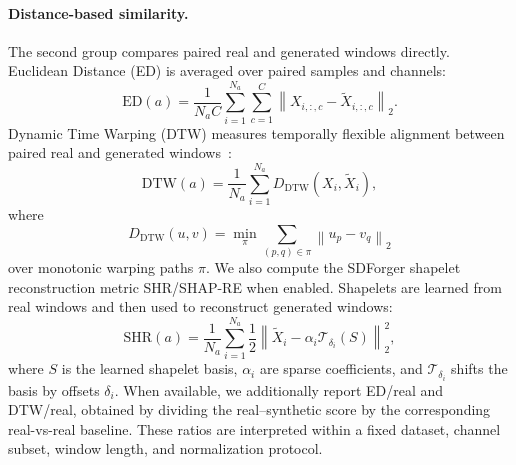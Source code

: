 \paragraph{Distance-based similarity.}
The second group compares paired real and generated windows directly. Euclidean
Distance (ED) is averaged over paired samples and channels:
\begin{equation}
    \mathrm{ED}(a)=
    \frac{1}{N_a C}
    \sum_{i=1}^{N_a}\sum_{c=1}^{C}
    \left\|X_{i,:,c}-\tilde{X}_{i,:,c}\right\|_2 .
\end{equation}
Dynamic Time Warping (DTW) measures temporally flexible alignment between paired
real and generated windows~\cite{sakoe1978dtw}:
\begin{equation}
    \mathrm{DTW}(a)=
    \frac{1}{N_a}
    \sum_{i=1}^{N_a}
    D_{\mathrm{DTW}}\!\left(X_i,\tilde{X}_i\right),
\end{equation}
where
\begin{equation}
    D_{\mathrm{DTW}}(u,v)=
    \min_{\pi}
    \sum_{(p,q)\in\pi}\left\|u_p-v_q\right\|_2
\end{equation}
over monotonic warping paths $\pi$. We also compute the SDForger shapelet
reconstruction metric SHR/SHAP-RE when enabled. Shapelets are learned from real
windows and then used to reconstruct generated windows:
\begin{equation}
    \mathrm{SHR}(a)
    =
    \frac{1}{N_a}
    \sum_{i=1}^{N_a}
    \frac{1}{2}
    \left\|
    \tilde{X}_i-\alpha_i\mathcal{T}_{\delta_i}(S)
    \right\|_2^2 ,
\end{equation}
where $S$ is the learned shapelet basis, $\alpha_i$ are sparse coefficients, and
$\mathcal{T}_{\delta_i}$ shifts the basis by offsets $\delta_i$. When
available, we additionally report ED/real and DTW/real, obtained by dividing the
real--synthetic score by the corresponding real-vs-real baseline. These ratios
are interpreted within a fixed dataset, channel subset, window length, and
normalization protocol.

